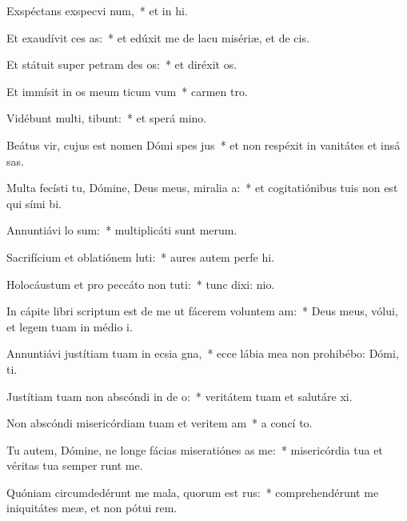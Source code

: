 \item Exspéctans exspecvi num,~* et in hi.
\item Et exaudívit ces as:~* et edúxit me de lacu misériæ, et de  cis.
\item Et státuit super petram des os:~* et diréxit  os.
\item Et immísit in os meum ticum vum~* carmen  tro.
\item Vidébunt multi,  tibunt:~* et sperá  mino.
\item Beátus vir, cujus est nomen Dómi spes jus~* et non respéxit in vanitátes et insá sas.
\item Multa fecísti tu, Dómine, Deus meus, miralia a:~* et cogitatiónibus tuis non est qui sími  bi.
\item Annuntiávi  lo sum:~* multiplicáti sunt  merum.
\item Sacrifícium et oblatiónem luti:~* aures autem perfe hi.
\item Holocáustum et pro peccáto non tuti:~* tunc dixi:  nio.
\item In cápite libri scriptum est de me ut fácerem voluntem am:~* Deus meus, vólui, et legem tuam in médio  i.
\item Annuntiávi justítiam tuam in ecsia gna,~* ecce lábia mea non prohibébo: Dómi,  ti.
\item Justítiam tuam non abscóndi in de o:~* veritátem tuam et salutáre  xi.
\item Non abscóndi misericórdiam tuam et veritem am~* a concí to.
\item Tu autem, Dómine, ne longe fácias miseratiónes as  me:~* misericórdia tua et véritas tua semper runt me.
\item Quóniam circumdedérunt me mala, quorum  est rus:~* comprehendérunt me iniquitátes meæ, et non pótui  rem.
